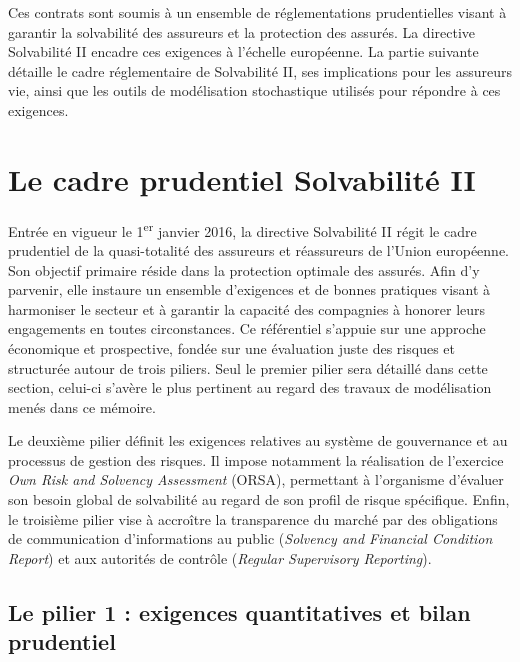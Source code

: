 Ces contrats sont soumis à un ensemble de réglementations prudentielles visant à garantir la solvabilité des assureurs et la protection des assurés. La directive Solvabilité II encadre ces exigences à l'échelle européenne. La partie suivante détaille le cadre réglementaire de Solvabilité II, ses implications pour les assureurs vie, ainsi que les outils de modélisation stochastique utilisés pour répondre à ces exigences.

\section{Le cadre prudentiel Solvabilité II}
\label{sec:s2}

Entrée en vigueur le 1\textsuperscript{er} janvier 2016, la directive Solvabilité II régit le cadre prudentiel de la quasi-totalité des assureurs et réassureurs de l'Union européenne. Son objectif primaire réside dans la protection optimale des assurés. Afin d'y parvenir, elle instaure un ensemble d'exigences et de bonnes pratiques visant à harmoniser le secteur et à garantir la capacité des compagnies à honorer leurs engagements en toutes circonstances. Ce référentiel s'appuie sur une approche économique et prospective, fondée sur une évaluation juste des risques et structurée autour de trois piliers. Seul le premier pilier sera détaillé dans cette section, celui-ci s'avère le plus pertinent au regard des travaux de modélisation menés dans ce mémoire.

Le deuxième pilier définit les exigences relatives au système de gouvernance et au processus de gestion des risques. Il impose notamment la réalisation de l'exercice \textit{Own Risk and Solvency Assessment} (ORSA), permettant à l'organisme d'évaluer son besoin global de solvabilité au regard de son profil de risque spécifique. Enfin, le troisième pilier vise à accroître la transparence du marché par des obligations de communication d'informations au public (\textit{Solvency and Financial Condition Report}) et aux autorités de contrôle (\textit{Regular Supervisory Reporting}).


\subsection{Le pilier 1 : exigences quantitatives et bilan prudentiel}

